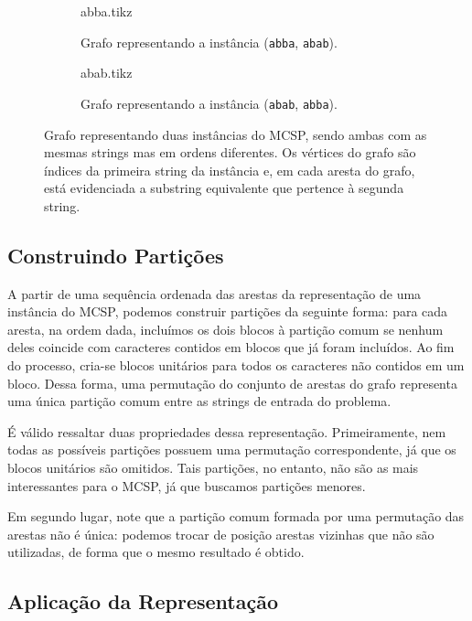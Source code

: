 \begin{figure}
    \centering
    \begin{subfigure}{\textwidth}
        \centering
        {abba.tikz}

        \caption{Grafo representando a instância (\texttt{abba}, \texttt{abab}).}
    \end{subfigure}
    \begin{subfigure}{\textwidth}
        \centering
        {abab.tikz}

        \caption{Grafo representando a instância (\texttt{abab}, \texttt{abba}).}
    \end{subfigure}

    \caption{Grafo representando duas instâncias do MCSP, sendo ambas com as mesmas strings mas em ordens diferentes. Os vértices do grafo são índices da primeira string da instância e, em cada aresta do grafo, está evidenciada a substring equivalente que pertence à segunda string.}
    \label{fig:grafo}
\end{figure}

\subsection{Construindo Partições} \label{sec:construindo-particoes}

    A partir de uma sequência ordenada das arestas da representação de uma instância do MCSP, podemos construir partições da seguinte forma: para cada aresta, na ordem dada, incluímos os dois blocos à partição comum se nenhum deles coincide com caracteres contidos em blocos que já foram incluídos. Ao fim do processo, cria-se blocos unitários para todos os caracteres não contidos em um bloco. Dessa forma, uma permutação do conjunto de arestas do grafo representa uma única partição comum entre as strings de entrada do problema.

    É válido ressaltar duas propriedades dessa representação. Primeiramente, nem todas as possíveis partições possuem uma permutação correspondente, já que os blocos unitários são omitidos. Tais partições, no entanto, não são as mais interessantes para o MCSP, já que buscamos partições menores.

    Em segundo lugar, note que a partição comum formada por uma permutação das arestas não é única: podemos trocar de posição arestas vizinhas que não são utilizadas, de forma que o mesmo resultado é obtido.

\subsection{Aplicação da Representação}

